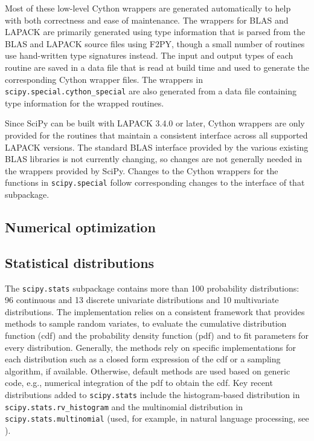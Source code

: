 \documentclass[fleqn,10pt]{wlscirep}
\begin{document}
Most of these low-level Cython wrappers are generated automatically to help
with both correctness and ease of maintenance.  The wrappers for BLAS and
LAPACK are primarily generated using type information that is parsed from the
BLAS and LAPACK source files using F2PY\cite{peterson2009f2py}, though a small
number of routines use hand-written type signatures instead.  The input and
output types of each routine are saved in a data file that is read at build
time and used to generate the corresponding Cython wrapper files.  The wrappers
in \texttt{scipy.{\allowbreak}special.{\allowbreak}cython\_special} are also
generated from a data file containing type information for the wrapped
routines.

Since SciPy can be built with LAPACK 3.4.0 or later, Cython wrappers are only
provided for the routines that maintain a consistent interface across all
supported LAPACK versions.  The standard BLAS interface provided by the various
existing BLAS libraries is not currently changing, so changes are not generally
needed in the wrappers provided by SciPy.  Changes to the Cython wrappers for
the functions in \texttt{scipy.{\allowbreak}special} follow corresponding
changes to the interface of that subpackage.

\subsection*{Numerical optimization}



\subsection*{Statistical distributions}

The \texttt{scipy.stats} subpackage contains more than 100 probability
distributions: 96 continuous and 13 discrete univariate distributions
and 10 multivariate distributions. The implementation relies on a
consistent framework that provides methods to sample random variates,
to evaluate the cumulative distribution function (cdf) and the probability
density function (pdf) and to fit parameters for every distribution. 
Generally, the methods rely on specific implementations for each
distribution such as a closed form expression of the cdf or a sampling 
algorithm, if available. Otherwise, default methods are used
based on generic code, e.g., numerical integration of the pdf to
obtain the cdf. 
Key recent distributions added to \texttt{scipy.stats} include the
histogram-based distribution in \texttt{scipy.stats.rv\_histogram}
and the multinomial distribution in \texttt{scipy.stats.multinomial}
(used, for example, in natural language processing, see
\cite{Griffiths5228}).
\end{document}
